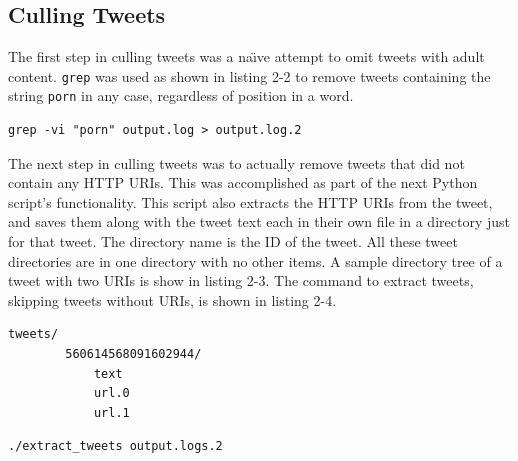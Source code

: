 \documentclass[a4paper,12pt]{article}
\begin{document}
\subsection{Culling Tweets}
The first step in culling tweets was a na\"{\i}ve attempt to omit tweets with adult content. \texttt{grep}
was used as shown in listing 2-2 to remove tweets containing the string \texttt{porn} in any case,
regardless of position in a word.
\begin{lstlisting}[basicstyle=\ttfamily,caption={Removing Naughty Tweets}]
    grep -vi "porn" output.log > output.log.2
\end{lstlisting}
The next step in culling tweets was to actually remove tweets that did not contain any HTTP URIs. This was
accomplished as part of the next Python script's functionality. This script also extracts the HTTP URIs from
 the tweet, and saves them along with the tweet text each in their own file in a directory just for that
tweet. The directory name is the ID of the tweet. All these tweet directories are in one directory with
no other items. A sample directory tree of a tweet with two URIs is show in
listing 2-3. The command to extract tweets, skipping tweets without URIs, is shown in listing 2-4.
\begin{lstlisting}[basicstyle=\ttfamily,caption={Tweet Directory Structure}]
    tweets/
        560614568091602944/
            text
            url.0
            url.1
\end{lstlisting}
\begin{lstlisting}[basicstyle=\ttfamily,caption={Extracting Tweets}]
    ./extract_tweets output.logs.2
\end{lstlisting}
\end{document}
